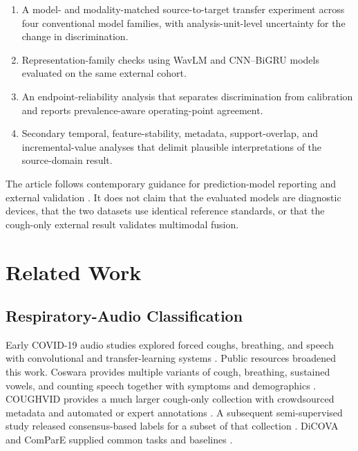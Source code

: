 \documentclass[journal]{IEEEtran}
\begin{document}
\begin{enumerate}
    \item A model- and modality-matched source-to-target transfer experiment across four conventional model families, with analysis-unit-level uncertainty for the change in discrimination.
    \item Representation-family checks using WavLM and CNN--BiGRU models evaluated on the same external cohort.
    \item An endpoint-reliability analysis that separates discrimination from calibration and reports prevalence-aware operating-point agreement.
    \item Secondary temporal, feature-stability, metadata, support-overlap, and incremental-value analyses that delimit plausible interpretations of the source-domain result.
\end{enumerate}

The article follows contemporary guidance for prediction-model reporting and external validation \cite{collins2024tripodai,moons2019probast,riley2024external1,riley2024external2}. It does not claim that the evaluated models are diagnostic devices, that the two datasets use identical reference standards, or that the cough-only external result validates multimodal fusion.

\section{Related Work}

\subsection{Respiratory-Audio Classification}

Early COVID-19 audio studies explored forced coughs, breathing, and speech with convolutional and transfer-learning systems \cite{laguarta2020cough,coppock2021pilot,pinkas2020voice,andreu2021generic}. Public resources broadened this work. Coswara provides multiple variants of cough, breathing, sustained vowels, and counting speech together with symptoms and demographics \cite{bhattacharya2023coswara}. COUGHVID provides a much larger cough-only collection with crowdsourced metadata and automated or expert annotations \cite{orlandic2021coughvid}. A subsequent semi-supervised study released consensus-based labels for a subset of that collection \cite{orlandic2023semisupervised}. DiCOVA and ComParE supplied common tasks and baselines \cite{muguli2021dicova,schuller2021compare,sharma2022dicova}.
\end{document}
